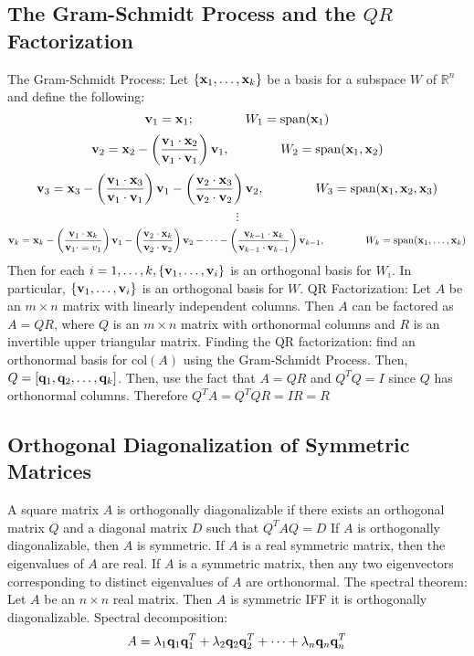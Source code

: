 \documentclass{article}
\begin{document}
    \subsection{The Gram-Schmidt Process and the \(QR\) Factorization}
    \begin{outline}
        \1 The Gram-Schmidt Process: Let \(\{\vb x_1,\ldots,\vb x_k\}\) be a basis for a subspace $W$ of \(\mathbb R^n\) and define the following: \[\vb v_1=\vb x_1;\qquad\qquad W_1=\text{span}(\vb x_1)\]\[\vb v_2=\vb x_2-\left(\dfrac{\vb v_1\cdot\vb x_2}{\vb v_1\cdot\vb v_1}\right)\vb v_1,\qquad\qquad W_2=\text{span}(\vb x_1,\vb x_2)\]\[\vb v_3=\vb x_3-\left(\dfrac{\vb v_1\cdot\vb x_3}{\vb v_1\cdot\vb v_1}\right)\vb v_1-\left(\dfrac{\vb v_2\cdot\vb x_3}{\vb v_2\cdot\vb v_2}\right)\vb v_2,\qquad\qquad W_3=\text{span}(\vb x_1,\vb x_2,\vb x_3)\]\[\vdots\]\[\vb v_k=\vb x_k-\left(\dfrac{\vb v_1\cdot\vb x_k}{\vb v_1\cdot=v_1}\right)\vb v_1-\left(\dfrac{\vb v_2\cdot\vb x_k}{\vb v_2\cdot\vb v_2}\right)\vb v_2-\cdots-\left(\dfrac{\vb v_{k-1}\cdot\vb x_k}{\vb v_{k-1}\cdot\vb v_{k-1}}\right)\vb v_{k-1},\qquad\qquad W_k=\text{span}(\vb x_1,\ldots,\vb x_k)\] Then for each \(i=1,\ldots,k,\{\vb v_1,\ldots,\vb v_i\}\) is an orthogonal basis for \(W_i\). In particular, \(\{\vb v_1,\ldots,\vb v_i\}\) is an orthogonal basis for $W$. 
        \1 QR Factorization: Let $A$ be an \(m\times n\) matrix with linearly independent columns. Then $A$ can be factored as $A=QR$, where $Q$ is an \(m\times n\) matrix with orthonormal columns and $R$ is an invertible upper triangular matrix. 
        \1 Finding the QR factorization: find an orthonormal basis for \(\text{col}(A)\) using the Gram-Schmidt Process. Then, \(Q=[\vb q_1,\vb q_2,\ldots,\vb q_k]\). Then, use the fact that \(A=QR\) and \(Q^TQ=I\) since $Q$ has orthonormal columns. Therefore \(Q^TA=Q^TQR=IR=R\)
    \end{outline}
    \subsection{Orthogonal Diagonalization of Symmetric Matrices}
    \begin{outline}
        \1 A square matrix $A$ is orthogonally diagonalizable if there exists an orthogonal matrix $Q$ and a diagonal matrix $D$ such that \(Q^TAQ=D\)
        \1 If $A$ is orthogonally diagonalizable, then $A$ is symmetric. 
        \1 If $A$ is a real symmetric matrix, then the eigenvalues of $A$ are real. 
        \1 If $A$ is a symmetric matrix, then any two eigenvectors corresponding to distinct eigenvalues of $A$ are orthonormal. 
        \1 The spectral theorem: Let $A$ be an \(n\times n\) real matrix. Then $A$ is symmetric IFF it is orthogonally diagonalizable. 
        \1 Spectral decomposition: \[A=\lambda_1\vb q_1\vb q_1^T+\lambda_2\vb q_2\vb q_2^T+\cdots+\lambda_n\vb q_n\vb q_n^T\]

    \end{outline}
\end{document}
